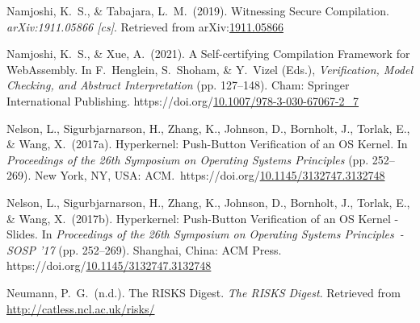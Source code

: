 \documentclass[12pt,twoside]{article}
\begin{document}
{\begin{thebibliography}{1079}
\mdbibitemlabel{}Namjoshi, K.~S., \& Tabajara, L.~M.~(2019). Witnessing Secure Compilation. \emph{arXiv:1911.05866 {}[cs]}. Retrieved from arXiv:\href{http://arxiv.org/abs/1911.05866}{1911.05866}%

\mdbibitemlabel{}Namjoshi, K.~S., \& Xue, A.~(2021). A Self-certifying Compilation Framework for WebAssembly. In F.~Henglein, S.~Shoham, \& Y.~Vizel (Eds.), \emph{Verification, Model Checking, and Abstract Interpretation} (pp. 127–148). Cham: Springer International Publishing. https://doi.org/\href{https://dx.doi.org/10.1007/978-3-030-67067-2_7}{10.1007/978-3-030-67067-2\_7}%

\mdbibitemlabel{}Nelson, L., Sigurbjarnarson, H., Zhang, K., Johnson, D., Bornholt, J., Torlak, E., \& Wang, X.~(2017a). Hyperkernel: Push-Button Verification of an OS Kernel. In \emph{Proceedings of the 26th Symposium on Operating Systems Principles} (pp. 252–269). New York, NY, USA: ACM.~https://doi.org/\href{https://dx.doi.org/10.1145/3132747.3132748}{10.1145/3132747.3132748}%

\mdbibitemlabel{}Nelson, L., Sigurbjarnarson, H., Zhang, K., Johnson, D., Bornholt, J., Torlak, E., \& Wang, X.~(2017b). Hyperkernel: Push-Button Verification of an OS Kernel - Slides. In \emph{Proceedings of the 26th Symposium on Operating Systems Principles~- SOSP ’17} (pp. 252–269). Shanghai, China: ACM Press. https://doi.org/\href{https://dx.doi.org/10.1145/3132747.3132748}{10.1145/3132747.3132748}%

\mdbibitemlabel{}Neumann, P.~G.~(n.d.). The RISKS Digest. \emph{The RISKS Digest}. Retrieved from \href{http://catless.ncl.ac.uk/risks/}{{\ttfamily http://\hspace{0pt}catless.\hspace{0pt}ncl.\hspace{0pt}ac.\hspace{0pt}uk/\hspace{0pt}risks/\hspace{0pt}}}%


\end{thebibliography}}
\end{document}
